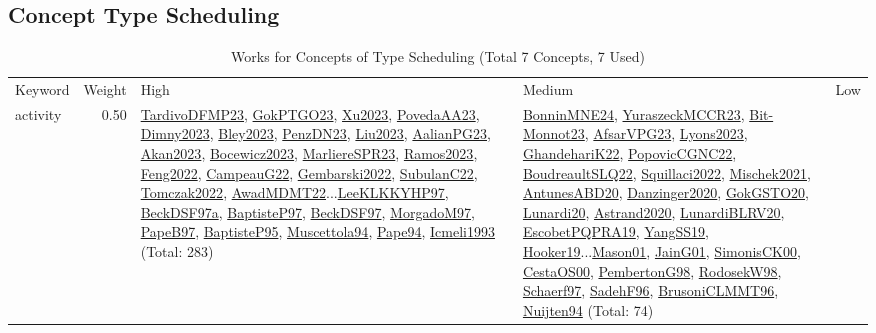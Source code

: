 \clearpage
\subsection{Concept Type Scheduling}
\label{sec:Scheduling}
\label{Scheduling}
{\scriptsize
\begin{longtable}{p{3cm}r>{\raggedright\arraybackslash}p{6cm}>{\raggedright\arraybackslash}p{6cm}>{\raggedright\arraybackslash}p{8cm}}
\rowcolor{white}\caption{Works for Concepts of Type Scheduling (Total 7 Concepts, 7 Used)}\\ \toprule
\rowcolor{white}Keyword & Weight & High & Medium & Low\\ \midrule\endhead
\bottomrule
\endfoot
\index{activity}\index{Scheduling!activity}activity &  0.50 & \hyperref[detail:TardivoDFMP23]{TardivoDFMP23}, \hyperref[detail:GokPTGO23]{GokPTGO23}, \hyperref[detail:Xu2023]{Xu2023}, \hyperref[detail:PovedaAA23]{PovedaAA23}, \hyperref[detail:Dimny2023]{Dimny2023}, \hyperref[detail:Bley2023]{Bley2023}, \hyperref[detail:PenzDN23]{PenzDN23}, \hyperref[detail:Liu2023]{Liu2023}, \hyperref[detail:AalianPG23]{AalianPG23}, \hyperref[detail:Akan2023]{Akan2023}, \hyperref[detail:Bocewicz2023]{Bocewicz2023}, \hyperref[detail:MarliereSPR23]{MarliereSPR23}, \hyperref[detail:Ramos2023]{Ramos2023}, \hyperref[detail:Feng2022]{Feng2022}, \hyperref[detail:CampeauG22]{CampeauG22}, \hyperref[detail:Gembarski2022]{Gembarski2022}, \hyperref[detail:SubulanC22]{SubulanC22}, \hyperref[detail:Tomczak2022]{Tomczak2022}, \hyperref[detail:AwadMDMT22]{AwadMDMT22}...\hyperref[detail:LeeKLKKYHP97]{LeeKLKKYHP97}, \hyperref[detail:BeckDSF97a]{BeckDSF97a}, \hyperref[detail:BaptisteP97]{BaptisteP97}, \hyperref[detail:BeckDSF97]{BeckDSF97}, \hyperref[detail:MorgadoM97]{MorgadoM97}, \hyperref[detail:PapeB97]{PapeB97}, \hyperref[detail:BaptisteP95]{BaptisteP95}, \hyperref[detail:Muscettola94]{Muscettola94}, \hyperref[detail:Pape94]{Pape94}, \hyperref[detail:Icmeli1993]{Icmeli1993} (Total: 283) & \hyperref[detail:BonninMNE24]{BonninMNE24}, \hyperref[detail:YuraszeckMCCR23]{YuraszeckMCCR23}, \hyperref[detail:Bit-Monnot23]{Bit-Monnot23}, \hyperref[detail:AfsarVPG23]{AfsarVPG23}, \hyperref[detail:Lyons2023]{Lyons2023}, \hyperref[detail:GhandehariK22]{GhandehariK22}, \hyperref[detail:PopovicCGNC22]{PopovicCGNC22}, \hyperref[detail:BoudreaultSLQ22]{BoudreaultSLQ22}, \hyperref[detail:Squillaci2022]{Squillaci2022}, \hyperref[detail:Mischek2021]{Mischek2021}, \hyperref[detail:AntunesABD20]{AntunesABD20}, \hyperref[detail:Danzinger2020]{Danzinger2020}, \hyperref[detail:GokGSTO20]{GokGSTO20}, \hyperref[detail:Lunardi20]{Lunardi20}, \hyperref[detail:Astrand2020]{Astrand2020}, \hyperref[detail:LunardiBLRV20]{LunardiBLRV20}, \hyperref[detail:EscobetPQPRA19]{EscobetPQPRA19}, \hyperref[detail:YangSS19]{YangSS19}, \hyperref[detail:Hooker19]{Hooker19}...\hyperref[detail:Mason01]{Mason01}, \hyperref[detail:JainG01]{JainG01}, \hyperref[detail:SimonisCK00]{SimonisCK00}, \hyperref[detail:CestaOS00]{CestaOS00}, \hyperref[detail:PembertonG98]{PembertonG98}, \hyperref[detail:RodosekW98]{RodosekW98}, \hyperref[detail:Schaerf97]{Schaerf97}, \hyperref[detail:SadehF96]{SadehF96}, \hyperref[detail:BrusoniCLMMT96]{BrusoniCLMMT96}, \hyperref[detail:Nuijten94]{Nuijten94} (Total: 74) & 
\end{longtable}}
